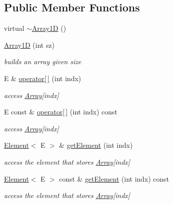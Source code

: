 \subsection*{Public Member Functions}
\begin{DoxyCompactItemize}
\item 
virtual \mbox{\hyperlink{classbridges_1_1datastructure_1_1_array1_d_a690a7802e32842acfda2688459bb2caa}{$\sim$\+Array1D}} ()
\item 
\mbox{\hyperlink{classbridges_1_1datastructure_1_1_array1_d_a04e070ed24a1c6e9d200add01ec91c95}{Array1D}} (int sz)
\begin{DoxyCompactList}\small\item\em builds an array given size \end{DoxyCompactList}\item 
E \& \mbox{\hyperlink{classbridges_1_1datastructure_1_1_array1_d_ac0e28b33231ba865d00dbaf1ad4d1b5b}{operator\mbox{[}$\,$\mbox{]}}} (int indx)
\begin{DoxyCompactList}\small\item\em access \mbox{\hyperlink{classbridges_1_1datastructure_1_1_array}{Array}}\mbox{[}indx\mbox{]} \end{DoxyCompactList}\item 
E const  \& \mbox{\hyperlink{classbridges_1_1datastructure_1_1_array1_d_a3eee632c4ba3bce5694da00f07e1ac65}{operator\mbox{[}$\,$\mbox{]}}} (int indx) const
\begin{DoxyCompactList}\small\item\em access \mbox{\hyperlink{classbridges_1_1datastructure_1_1_array}{Array}}\mbox{[}indx\mbox{]} \end{DoxyCompactList}\item 
\mbox{\hyperlink{classbridges_1_1datastructure_1_1_element}{Element}}$<$ E $>$ \& \mbox{\hyperlink{classbridges_1_1datastructure_1_1_array1_d_a48fbe4ee71c52303033effcd4e1369c0}{get\+Element}} (int indx)
\begin{DoxyCompactList}\small\item\em access the element that stores \mbox{\hyperlink{classbridges_1_1datastructure_1_1_array}{Array}}\mbox{[}indx\mbox{]} \end{DoxyCompactList}\item 
\mbox{\hyperlink{classbridges_1_1datastructure_1_1_element}{Element}}$<$ E $>$ const  \& \mbox{\hyperlink{classbridges_1_1datastructure_1_1_array1_d_a92398a260b9d2a09d6f1f536a36a0988}{get\+Element}} (int indx) const
\begin{DoxyCompactList}\small\item\em access the element that stores \mbox{\hyperlink{classbridges_1_1datastructure_1_1_array}{Array}}\mbox{[}indx\mbox{]} \end{DoxyCompactList}\item 

\end{DoxyCompactItemize}
